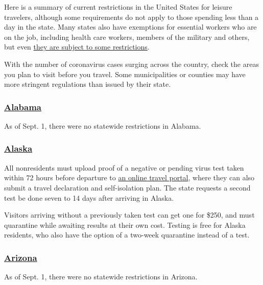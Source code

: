 Here is a summary of current restrictions in the United States for
leisure travelers, although some requirements do not apply to those
spending less than a day in the state. Many states also have exemptions
for essential workers who are on the job, including health care workers,
members of the military and others, but even
\href{https://www.ncsl.org/research/labor-and-employment/covid-19-essential-workers-in-the-states.aspx}{they
are subject to some restrictions}.

With the number of coronavirus cases surging across the country, check
the areas you plan to visit before you travel. Some municipalities or
counties may have more stringent regulations than issued by their state.

\hypertarget{alabama}{%
\subsubsection{\texorpdfstring{\href{https://alabama.travel/my-trip/staying-safe}{Alabama}}{Alabama}}\label{alabama}}

As of Sept. 1, there were no statewide restrictions in Alabama.

\hypertarget{alaska}{%
\subsubsection{\texorpdfstring{\href{https://covid19.alaska.gov/travelers/}{Alaska}}{Alaska}}\label{alaska}}

All nonresidents must upload proof of a negative or pending virus test
taken within 72 hours before departure to
\href{https://www.alaska.covidsecureapp.com/}{an online travel portal},
where they can also submit a travel declaration and self-isolation plan.
The state requests a second test be done seven to 14 days after arriving
in Alaska.

Visitors arriving without a previously taken test can get one for \$250,
and must quarantine while awaiting results at their own cost. Testing is
free for Alaska residents, who also have the option of a two-week
quarantine instead of a test.

\hypertarget{arizona}{%
\subsubsection{\texorpdfstring{\href{https://tourism.az.gov/covid-19-updates-2/}{Arizona}}{Arizona}}\label{arizona}}

As of Sept. 1, there were no statewide restrictions in Arizona.

